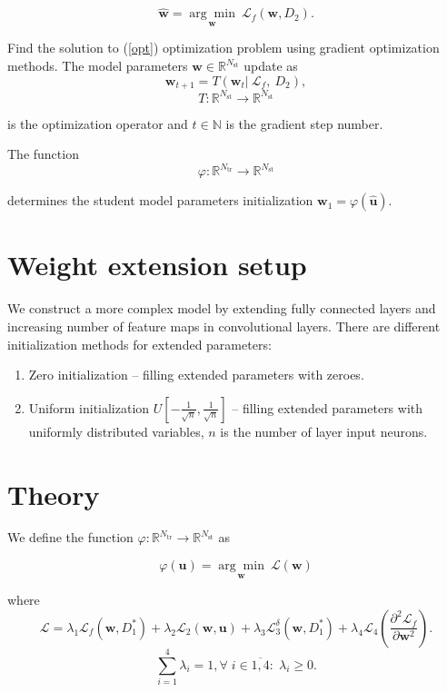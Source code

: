\documentclass[80pt]{article}
\begin{document}
\begin{equation}\label{opt}
    \hat{\mathbf{w}} =  \underset{\mathbf{w}}{\arg\min}~\mathcal{L}_f(\mathbf{w}, D_2).
\end{equation}

Find the solution to (\ref{opt}) optimization problem using gradient optimization methods. The model parameters $\mathbf{w} \in \mathbb{R}^{N_{\text{st}}}$ update as
\[\mathbf{w}_{t+1} = T(\mathbf{w}_t |~\mathcal{L}_f,~D_2),\]
\[T: \mathbb{R}^{N_\text{st}} \rightarrow \mathbb{R}^{N_\text{st}}\]

is the optimization operator and $t \in \mathbb{N}$ is the gradient step number.

The function 
\[\varphi: \mathbb{R}^{N_\text{tr}} \rightarrow \mathbb{R}^{N_\text{st}}\]

determines the student model parameters initialization $\mathbf{w}_1 = \varphi(\hat{\mathbf{u}})$.

\section{Weight extension setup}
\label{sec:setup}

We construct a more complex model by extending fully connected layers and increasing number of feature maps in convolutional layers. There are different initialization methods for extended parameters:

\begin{enumerate}
    \item Zero initialization -- filling extended parameters with zeroes.
    \item Uniform initialization $U[-\frac1{\sqrt{n}}, \frac1{\sqrt{n}}]$ -- filling extended parameters with uniformly distributed variables, $n$ is the number of layer input neurons.
\end{enumerate}

\section{Theory}

We define the function $\varphi: \mathbb{R}^{N_\text{tr}} \rightarrow \mathbb{R}^{N_\text{st}}$ as

\begin{equation}\label{phi}
  \varphi(\mathbf{u}) = \underset{\mathbf{w}}{\arg\min}~\mathcal{L}(\mathbf{w})
\end{equation}

where \[\mathcal{L} = \lambda_1 \mathcal{L}_f(\mathbf{w}, D_1^*) + \lambda_2 \mathcal{L}_2 (\mathbf{w}, \mathbf{u}) + \lambda_3 \mathcal{L}_3^\delta (\mathbf{w}, D_1^*) + \lambda_4 \mathcal{L}_4 \left(\displaystyle \frac{\partial^2 \mathcal{L}_f}{\partial \mathbf{w}^2}\right).\]
\[\sum\limits_{i=1}^4 \lambda_i =1, \forall\; i \in \overline{1, 4}:\; \lambda_i \ge 0.\]
\end{document}
